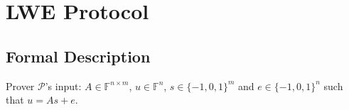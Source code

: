     
    
    
    






\section{LWE Protocol}


\subsection{Formal Description}

Prover $\mathcal{P}$'s input: $A \in \mathbb{F}^{n \times m}$, $u \in \mathbb{F}^{n}$, $s \in \{-1, 0, 1\}^{m}$ and $e \in \{-1, 0, 1\}^{n}$ such that $u = As + e$.

